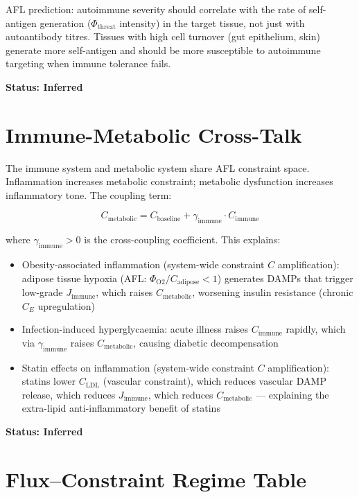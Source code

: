 \documentclass[12pt,a4paper]{article}
\begin{document}
AFL prediction: autoimmune severity should correlate with the rate of self-antigen generation ($\Phi_{\mathrm{threat}}$ intensity) in the target tissue, not just with autoantibody titres. Tissues with high cell turnover (gut epithelium, skin) generate more self-antigen and should be more susceptible to autoimmune targeting when immune tolerance fails.

\textbf{Status: Inferred}

\section{Immune-Metabolic Cross-Talk}

The immune system and metabolic system share AFL constraint space. Inflammation increases metabolic constraint; metabolic dysfunction increases inflammatory tone. The coupling term:

\begin{equation}
    C_{\mathrm{metabolic}} = C_{\mathrm{baseline}} + \gamma_{\mathrm{immune}} \cdot C_{\mathrm{immune}}
\end{equation}

where $\gamma_{\mathrm{immune}} > 0$ is the cross-coupling coefficient. This explains:
\begin{itemize}
    \item Obesity-associated inflammation (system-wide constraint $C$ amplification): adipose tissue hypoxia (AFL: $\Phi_{\mathrm{O2}} / C_{\mathrm{adipose}} < 1$) generates DAMPs that trigger low-grade $J_{\mathrm{immune}}$, which raises $C_{\mathrm{metabolic}}$, worsening insulin resistance (chronic $C_E$ upregulation)
    \item Infection-induced hyperglycaemia: acute illness raises $C_{\mathrm{immune}}$ rapidly, which via $\gamma_{\mathrm{immune}}$ raises $C_{\mathrm{metabolic}}$, causing diabetic decompensation
    \item Statin effects on inflammation (system-wide constraint $C$ amplification): statins lower $C_{\mathrm{LDL}}$ (vascular constraint), which reduces vascular DAMP release, which reduces $J_{\mathrm{immune}}$, which reduces $C_{\mathrm{metabolic}}$ --- explaining the extra-lipid anti-inflammatory benefit of statins
\end{itemize}

\textbf{Status: Inferred}

\section{Flux--Constraint Regime Table}
\end{document}
